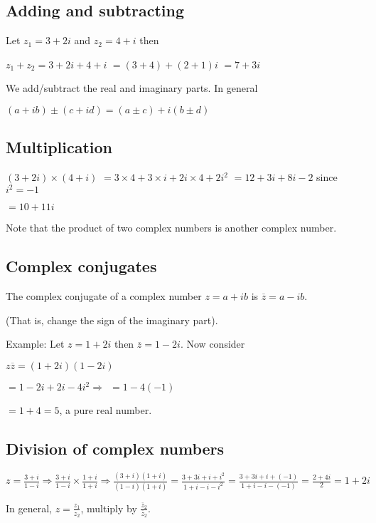 \documentclass{extarticle}
\begin{document}
\begin{multicols}{4}
\subsection{Adding and subtracting}

Let $z_1=3+2i$ and $z_2=4+i$ then

$z_1+z_2=3+2i+4+i$
$=\left(3+4\right)+\left(2+1\right)i$
$=7+3i$


We add/subtract the real and imaginary parts.
In general

$\left(a+ib\right)\pm\left(c+id\right)=\left(a\pm c\right)+i\left(b\pm d\right)$

\subsection{Multiplication}

$\left(3+2i\right)\times\left(4+i\right)$ $=3\times4+3\times i+2i\times4+2i^2$ $=12+3i+8i-2$
since $i^2=-1$

$=10+11i$

Note that the product of two complex numbers is another complex number.


\subsection{Complex conjugates}

The complex conjugate of a complex number $z=a+ib$ is $\overline{z}=a-ib$. 

(That is, change the sign of the imaginary part).

Example: Let $z=1+2i$ then $\overline{z}=1-2i$. Now consider

$z\overline{z}=\left(1+2i\right)\left(1-2i\right)$

$=1-2i+2i-4i^2\Rightarrow\ \ =1-4\left(-1\right)$

$=1+4=5$, a pure real number.



\subsection{Division of complex numbers}

$z=\frac{3+i}{1-i}\Rightarrow\frac{3+i}{1-i}\times\frac{1+i}{1+i}\Rightarrow\frac{\left(3+i\right)\left(1+i\right)}{\left(1-i\right)\left(1+i\right)}=\frac{3+3i+i+i^2}{1+i-i-i^2}=\frac{3+3i+i+(-1)}{1+i-i-(-1)}=\frac{2+4i}{2}=1+2i$

In general, $z=\frac{z_1}{z_2}$, multiply by $\frac{{\overline{z}}_2}{{\overline{z}}_2}$.


\end{multicols}
\end{document}
